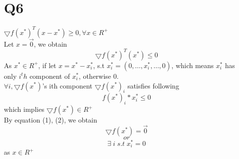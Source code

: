 \documentclass{article}
\begin{document}
\section{Q6}
$\bigtriangledown f(x^*)^{T}(x-x^*) \geq 0, \forall x \in R^+$\\
Let $x = \Vec{0}$, we obtain \\
\[\bigtriangledown f(x^*)^{T}(x^*) \leq 0 \tag{1} \label{eq:special} \]
As $x^* \in R^+$, if let $x = x^* - x^*_{i}$, s.t $x_{i}^* = (0,\dots,x^*_{i},\dots,0)$, which means $x^*_{i}$ has only $i^th$ component of $x^*_{i}$, otherwise 0.\\
$\forall i, \bigtriangledown f(x^*)$'s ith component $\bigtriangledown f(x^*)_{i}$ satisfies following\\ 
\[f(x^*)_{i}*x^*_{i}   \leq 0 \tag{2} \label{eq:special}\]
which implies $\bigtriangledown f(x^*)  \in R^+$\\
By equation (1), (2), we obtain\\
\[\bigtriangledown f(x^*) = \Vec{0} \]
\[or\]
\[\exists \; i\; s.t \; x^*_{i} = 0\]
as $x \in R^+ $
\end{document}
